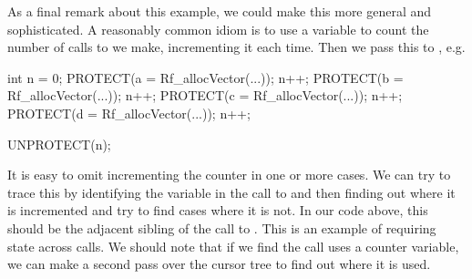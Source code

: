 \begin{comment}
f = system.file("exampleCode", "protectCorrect.c", package = "RCIndex")
r = getRoutines(f, f, includes = sprintf("%
v = genProtectAnalyzer()
visitCursor(r$R_foo, v$update)
v$info()
\end{comment}



As a final remark about this example, we could make this more general
and sophisticated.  A reasonably common idiom is to use a variable to
count the number of calls to  we make, incrementing it
each time. Then we pass this to , e.g.
\begin{CCode}
 int n = 0;
 PROTECT(a = Rf_allocVector(...)); n++;
 PROTECT(b = Rf_allocVector(...)); n++;
 PROTECT(c = Rf_allocVector(...)); n++;
 PROTECT(d = Rf_allocVector(...)); n++;

 UNPROTECT(n);
\end{CCode}
It is easy to omit incrementing the counter in one or more cases. We
can try to trace this by identifying the variable in the call to
 and then finding out where it is incremented and try
to find cases where it is not.  In our code above, this should be the
adjacent sibling of the call to . This is an example of
requiring state across calls.  We should note that if we find the
 call uses a counter variable, we can make a second pass over the
cursor tree to find out where it is used.


